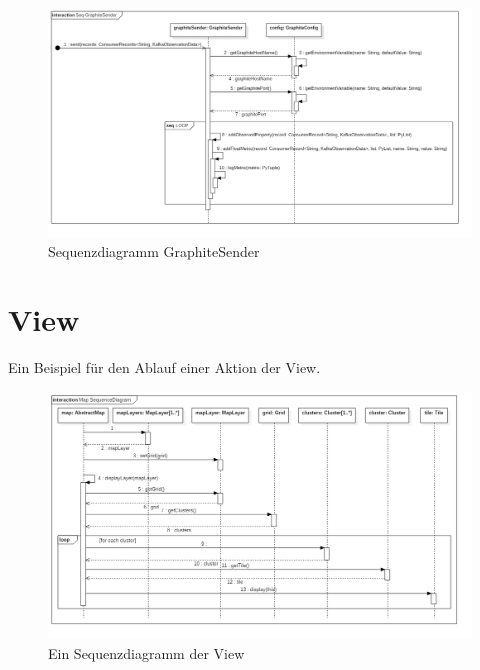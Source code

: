 {{{{{\begin{figure}[!hbp]
	\centering
	\includegraphics[width=\linewidth]{images/graphite/GraphiteSenderSequenceDiagram.png}
	\caption{Sequenzdiagramm GraphiteSender}
\end{figure}
\newpage

\section{View}
Ein Beispiel für den Ablauf einer Aktion der View.
\begin{figure}[!hbp]
	\centering
	\includegraphics[width=\linewidth]{images/view/ViewSequenceDiagram.png}
	\caption{Ein Sequenzdiagramm der View}
\end{figure}
\newpage

}}}}}
